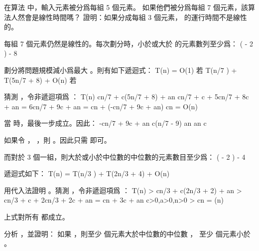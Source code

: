 \startsection[
  title={Selection in worst-case linear time},
  reference=section:worstcase_linear_selection,
]

\startEXERCISE
在算法  中，輸入元素被分爲每組 5 個元素。
如果他們被分爲每組 7 個元素，該算法人然會是線性時間嗎？
證明：如果分成每組 3 個元素，  的運行時間不是線性的。
\stopEXERCISE

\startANSWER
每組 7 個元素仍然是線性的。每次劃分時，小於或大於  的元素數列至少爲：
 \left(\lceil {} \left\lceil {} \rceil \right\rceil
           - 2 \right) \ge {} - 8
\stopformula

劃分將問題規模減小爲最大 。則有如下遞迴式：
\startformula
T(n) = \startmathcases
 \NC O(1) \NC 若  \NR
 \NC T(\lceil n/7 \rceil) + T(5n/7 + 8) + O(n) \NC 若  \NR
\stopmathcases
\stopformula

猜測 ，令非遞迴項爲 ：
\startformula\startmathalignment
\NC T(n) \NC \le c\lceil n/7 \rceil + c(5n/7 + 8) + an \NR
\NC \NC \le cn/7 + c + 5cn/7 + 8c + an \NR
\NC \NC = 6cn/7 + 9c + an \NR
\NC \NC = cn + (-cn/7 + 9c + an) \NR
\NC \NC \le cn \NR
\NC \NC = O(n) \NR
\stopmathalignment\stopformula

當  時，最後一步成立。因此：
\startformula\startmathalignment[n=1]
\NC -cn/7 + 9c + an  \NR
\NC \Downarrow \NR
\NC c(n/7 - 9) \ge an \NR
\NC \Downarrow \NR
\NC {} \ge an \NR
\NC \Downarrow \NR
\NC c \ge {} \NR
\stopmathalignment\stopformula

如果令 ， ，則 。因此只需  即可。

而對於 3 個一組，則大於或小於中位數的中位數的元素數目至少爲：
 \left(\lceil {} \left\lceil {} \rceil \right\rceil
           - 2 \right) \ge {} - 4
\stopformula

遞迴式如下：
\startformula
T(n) = T(\lceil n/3 \rceil) + T(2n/3 + 4) + O(n)
\stopformula

用代入法證明 。猜測 ，令非遞迴項爲 ：
\startformula\startmathalignment
\NC T(n) \NC > c\lceil n/3 \rceil + c(2n/3 + 2) + an \NR
\NC \NC > cn/3 + c + 2cn/3 + 2c + an \NR
\NC \NC = cn + 3c + an \qquad c>0,a>0,n>0\NR
\NC \NC > cn \NR
\NC \NC = \omega(n) \NR
\stopmathalignment\stopformula

上式對所有  都成立。
\stopANSWER

分析 ，並證明：
如果 ，則至少  個元素大於中位數的中位數 ，
至少  個元素小於 。
\stopEXERCISE

